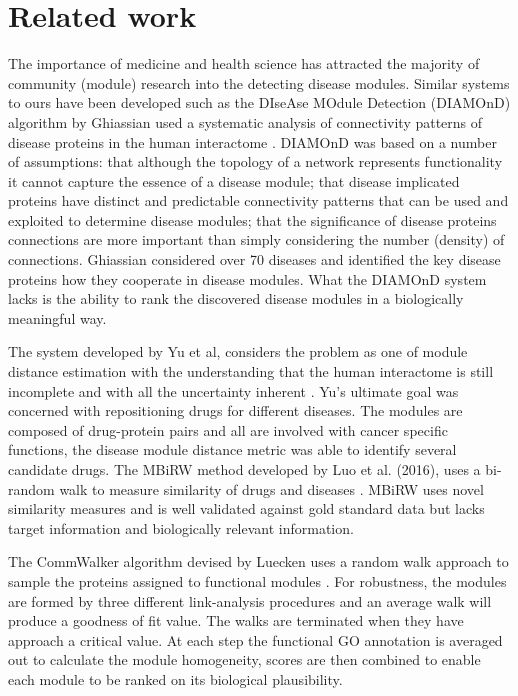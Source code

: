 \documentclass[a4paper,8pt,twocolumn,5p]{elsarticle}
\begin{document}
\section{Related work}
The importance of medicine and health science has attracted the majority of community (module) research into the detecting disease modules. Similar systems to ours have been developed such as the {DI}se{A}se {MO}dule {D}etection ({DIAMOnD}) algorithm by Ghiassian used a systematic analysis of connectivity patterns of disease proteins in the human interactome \citep{Ghiassian2015}. DIAMOnD was based on a number of assumptions: that although the topology of a network represents  functionality it cannot capture the essence of a disease module; that disease implicated proteins have distinct and predictable connectivity patterns that can be used and exploited to determine disease modules; that the significance of disease proteins connections are more important than simply considering the number (density) of connections. Ghiassian considered over 70 diseases and identified the key disease proteins how they cooperate in disease modules. What the DIAMOnD system lacks is the ability to rank the discovered disease modules in a biologically meaningful way.

The system developed by Yu et al, considers the problem as one of module distance estimation with the understanding that the human interactome is still incomplete and with all the uncertainty inherent \citep{Yu2016}. Yu's ultimate goal was concerned with repositioning drugs for different diseases. The modules are composed of drug-protein pairs and all are involved with cancer specific functions, the disease module distance metric was able to identify several candidate drugs. The MBiRW method developed by Luo et al. (2016), uses a bi-random walk to measure similarity of drugs and diseases \cite{Luo2017}. MBiRW uses novel similarity measures and is well validated against gold standard data but lacks target information and biologically relevant information.  

The CommWalker algorithm devised by Luecken uses a random walk approach to sample the proteins assigned to functional modules \citep{Luecken2017}. For robustness, the modules are formed by three different link-analysis procedures and an average walk will produce a goodness of fit value. The walks are terminated when they have approach a critical value. At each step the functional GO annotation is averaged out to calculate  the module homogeneity, scores are then combined to enable each module to be ranked on its biological plausibility. 
\end{document}
